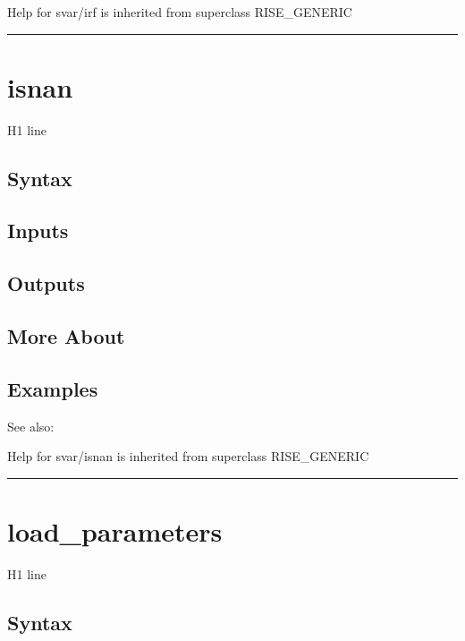 \documentclass[letterpaper,10pt,english]{sphinxmanual}
\begin{document}
Help for svar/irf is inherited from superclass RISE\_GENERIC


\bigskip\hrule{}\bigskip



\section{isnan}
\label{classes/models/@svar/svar:id37}\label{classes/models/@svar/svar:isnan}
H1 line


\subsection{Syntax}
\label{classes/models/@svar/svar:id38}

\subsection{Inputs}
\label{classes/models/@svar/svar:id39}

\subsection{Outputs}
\label{classes/models/@svar/svar:id40}

\subsection{More About}
\label{classes/models/@svar/svar:id41}

\subsection{Examples}
\label{classes/models/@svar/svar:id42}
See also:

Help for svar/isnan is inherited from superclass RISE\_GENERIC


\bigskip\hrule{}\bigskip



\section{load\_parameters}
\label{classes/models/@svar/svar:id43}\label{classes/models/@svar/svar:load-parameters}
H1 line


\subsection{Syntax}
\label{classes/models/@svar/svar:id44}
\end{document}
